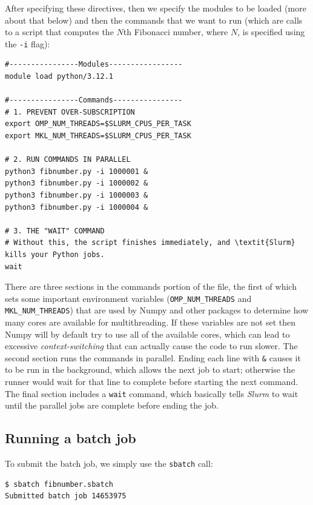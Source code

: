 After specifying these directives, then we specify the modules to be loaded (more about that below) and then the commands that we want to run (which are calls to a script that computes the $N$th Fibonacci number, where $N$, is specified using the \texttt{-i} flag):

\begin{lstlisting}[style=shell]
#----------------Modules----------------- 
module load python/3.12.1

#----------------Commands----------------
# 1. PREVENT OVER-SUBSCRIPTION
export OMP_NUM_THREADS=$SLURM_CPUS_PER_TASK
export MKL_NUM_THREADS=$SLURM_CPUS_PER_TASK

# 2. RUN COMMANDS IN PARALLEL
python3 fibnumber.py -i 1000001 &
python3 fibnumber.py -i 1000002 &
python3 fibnumber.py -i 1000003 &
python3 fibnumber.py -i 1000004 &

# 3. THE "WAIT" COMMAND
# Without this, the script finishes immediately, and \textit{Slurm} kills your Python jobs.
wait
\end{lstlisting}

There are three sections in the commands portion of the file, the first of which sets some important environment variables (\texttt{OMP\_NUM\_THREADS} and \texttt{MKL\_NUM\_THREADS}) that are used by Numpy and other packages to determine how many cores are available for multithreading.  If these variables are not set then Numpy will by default try to use all of the available cores, which can lead to excessive \textit{context-switching} that can actually cause the code to run slower.  The second section runs the commands in parallel.  Ending each line with \texttt{\&} causes it to be run in the background, which allows the next job to start; otherwise the runner would wait for that line to complete before starting the next command.  The final section includes a \texttt{wait} command, which basically tells \textit{Slurm} to wait until the parallel jobs are complete before ending the job.

\subsection{Running a batch job}

To submit the batch job, we simply use the \texttt{sbatch} call:

\begin{lstlisting}[style=shellshort]
$ sbatch fibnumber.sbatch
Submitted batch job 14653975
\end{lstlisting}


